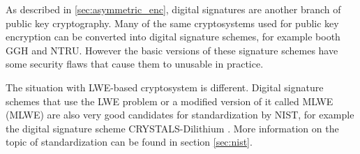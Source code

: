 As described in \ref{sec:asymmetric_enc}, digital signatures are another branch of public key cryptography. Many of the same cryptosystems used for public key encryption can be converted into digital signature schemes, for example booth GGH and NTRU. However the basic versions of these signature schemes have some security flaws that cause them to unusable in practice. \cite{Bernstein2009}

The situation with LWE-based cryptosystem is different. Digital signature schemes that use the LWE problem or a modified version of it called MLWE (\acl{MLWE}) are also very good candidates for standardization by NIST, for example the digital signature scheme CRYSTALS-Dilithium \cite{Grimes2020}. More information on the topic of standardization can be found in section \ref{sec:nist}.
